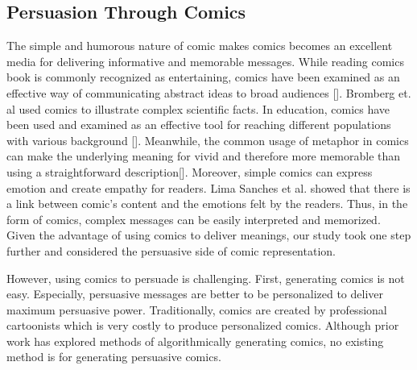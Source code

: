 \subsection{Persuasion Through Comics}
The simple and humorous nature of comic makes comics becomes an excellent media for delivering informative and memorable messages. While reading comics book is commonly recognized as entertaining, comics have been examined as an effective way of communicating abstract ideas to broad audiences []. Bromberg et. al used comics to illustrate complex scientific facts. In education, comics have been used and examined as an effective tool for reaching different populations with various background []. Meanwhile, the common usage of metaphor in comics can make the underlying meaning for vivid and therefore more memorable than using a straightforward description[]. Moreover, simple comics can express emotion and create empathy for readers. Lima Sanches et al. showed that there is a link between comic's content and the emotions felt by the readers. Thus, in the form of comics, complex messages can be easily interpreted and memorized. Given the advantage of using comics to deliver meanings, our study took one step further and considered the persuasive side of comic representation. \par
However, using comics to persuade is challenging. First, generating comics is not easy. Especially, persuasive messages are better to be personalized to deliver maximum persuasive power. Traditionally, comics are created by professional cartoonists which is very costly to produce personalized comics.  Although prior work has explored methods of algorithmically generating comics, no existing method is for generating persuasive comics. \par
